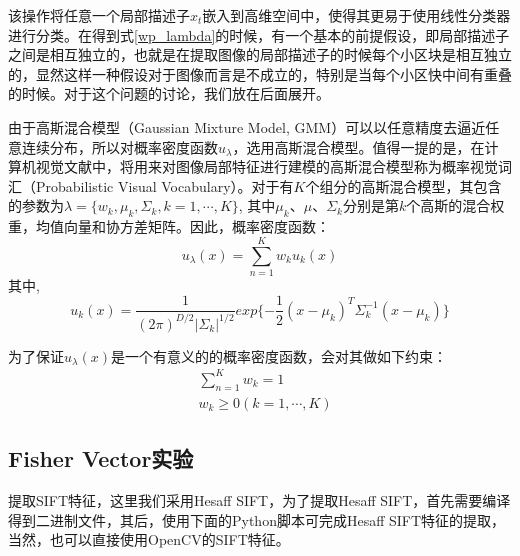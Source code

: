 \documentclass[color=cyan,mathpazo,titlestyle=hang]{elegantbook}
\begin{document}
该操作将任意一个局部描述子$x_t$嵌入到高维空间中，使得其更易于使用线性分类器进行分类。在得到式\eqref{wp_lambda}的时候，有一个基本的前提假设，即局部描述子之间是相互独立的，也就是在提取图像的局部描述子的时候每个小区块是相互独立的，显然这样一种假设对于图像而言是不成立的，特别是当每个小区快中间有重叠的时候。对于这个问题的讨论，我们放在后面展开。

由于高斯混合模型（Gaussian Mixture Model, GMM）可以以任意精度去逼近任意连续分布，所以对概率密度函数$u_\lambda$，选用高斯混合模型。值得一提的是，在计算机视觉文献中，将用来对图像局部特征进行建模的高斯混合模型称为概率视觉词汇（Probabilistic Visual Vocabulary）。对于有$K$个组分的高斯混合模型，其包含的参数为$\lambda = \lbrace w_k, \mu_k, \Sigma_k, k = 1, \cdots, K \rbrace$, 其中$\mu_k$、$\mu$、$\Sigma_k$分别是第$k$个高斯的混合权重，均值向量和协方差矩阵。因此，概率密度函数：
\begin{equation}
u_\lambda(x) = \sum_{n=1}^{K} w_k u_k(x)
\label{u_lambda}
\end{equation}
其中,
\begin{equation}
u_k(x) = \frac{1}{(2\pi)^{D/2} |\Sigma_k|^{1/2}} exp \lbrace - \frac{1}{2} (x-\mu_k)^T \Sigma_k^{-1} (x-\mu_k) \rbrace
\end{equation}

为了保证$u_\lambda(x)$是一个有意义的的概率密度函数，会对其做如下约束：
\begin{equation}
\begin{split}
& \sum_{n=1}^{K} w_k = 1 \\
& w_k \geq 0 (k = 1, \cdots, K)
\end{split}
\end{equation}

\subsection{Fisher Vector实验}

提取SIFT特征，这里我们采用Hesaff SIFT，为了提取Hesaff SIFT，首先需要编译得到二进制文件，其后，使用下面的Python脚本可完成Hesaff SIFT特征的提取，当然，也可以直接使用OpenCV的SIFT特征。
\end{document}
